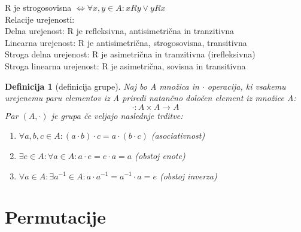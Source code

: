 \documentclass[a4paper, 12pt]{book}
\newtheorem{definicija}{Definicija}[chapter]
\begin{document}
R je strogosovisna $\Leftrightarrow \forall x,y\in A: xRy \lor yRx $\\
Relacije urejenosti: \\
Delna urejenost: R je refleksivna, antisimetrična in tranzitivna \\
Linearna urejenost: R je antisimetrična, strogosovisna, transitivna \\ 
Stroga delna urejenost: R je asimetrična in tranzitivna (irefleksivna)  \\
Stroga linearna urejenost: R je asimetrična, sovisna in transitivna  \\


\begin{definicija}[definicija grupe]
    Naj bo A množica in $\cdot$ operacija, ki vsakemu urejenemu paru elementov iz A priredi natančno določen element iz množice A:
    \[
        \cdot:A \times A \rightarrow A 
    \]
    Par $(A, \cdot)$ je grupa če veljajo naslednje trditve:
    \begin{enumerate}
        \item $\forall a, b, c \in A: (a \cdot b) \cdot c = a \cdot (b \cdot c)$ (asociativnost)
        \item $\exists e \in A: \forall a \in A: a \cdot e = e \cdot a = a$ (obstoj enote)
        \item $\forall a \in A: \exists a^{-1} \in A: a \cdot a^{-1} = a^{-1} \cdot a = e$ (obstoj inverza)
        
    \end{enumerate}
\end{definicija}

\chapter{ Permutacije }
\end{document}
